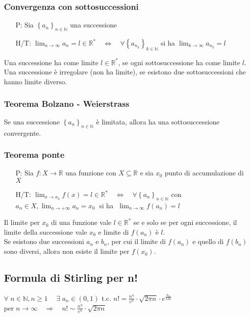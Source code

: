 \documentclass[a4paper]{article}
\begin{document}
\subsubsection*{Convergenza con sottosuccessioni}
\begin{itemize}
	\item[P:] Sia \(\left\{ a_n \right\}_{n \in \mathbb{N}}\) una successione
	\item[H/T:] \(\displaystyle \lim_{n \to \infty} a_n = l \in \mathbb{R}^* \quad \Leftrightarrow \quad \forall \left\{ a_{n_k} \right\}_{k \in \mathbb{N}}\) si ha \(\displaystyle \lim_{k \to \infty} a_{n_k} = l\)
\end{itemize}
Una successione ha come limite \(l \in \mathbb{R}^*\), se ogni sottosuccessione ha come limite \(l\). \\
Una successione è irregolare (non ha limite), se esistono due sottosuccessioni che hanno limite diverso.

\subsubsection*{Teorema Bolzano - Weierstrass}
Se una successione \(\left\{ a_n \right\}_{n \in \mathbb{N}}\) è limitata, allora ha una sottosuccessione convergente.

\subsubsection*{Teorema ponte}
\begin{itemize}
	\item[P:] Sia \(f: X \to \mathbb{R}\) una funzione con \(X \subseteq \mathbb{R}\) e sia \(x_0\) punto di accumulazione di \(X\)
	\item[H/T:] \(\displaystyle \lim_{x \to x_0} f(x) = l \in \mathbb{R}^* \quad \Leftrightarrow \quad \forall \left\{ a_n \right\}_{n \in \mathbb{N}}\) con \(\displaystyle a_n \in X, \lim_{n \to +\infty} a_n = x_0 \;\) si ha \(\; \displaystyle \lim_{n \to \infty} f(a_n) = l\)
\end{itemize}
Il limite per \(x_0\) di una funzione vale \(l \in \mathbb{R}^*\) se e solo se per ogni successione, il limite della successione vale \(x_0\) e limite di \(f(a_n)\) è \(l\). \\
Se esistono due successioni \(a_n\) e \(b_n\), per cui il limite di \(f(a_n)\) e quello di \(f(b_n)\) sono diversi, allora non esiste il limite per \(f(x_0)\).

\subsection{Formula di Stirling per n!}
\(\forall \; n \in \mathbb{N}, n \geq 1 \quad \; \exists \; a_n \in \left( 0, 1 \right)\) t.c. \(\displaystyle n! = \frac{n^n}{e^n} \cdot \sqrt{2 \pi n} \cdot e ^ {\frac{a_n}{12n}}\) \\
per \(\displaystyle n \to \infty \quad \Rightarrow \quad n! \sim \frac{n^n}{e^n} \cdot \sqrt{2 \pi n}\)
\end{document}
